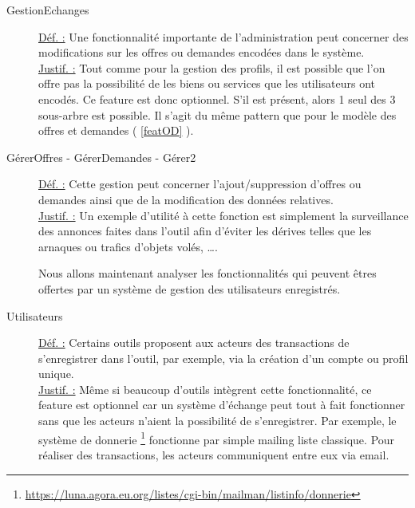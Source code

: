 \begin{description}
\item [GestionEchanges]
\underline{Déf. :}  Une fonctionnalité importante de l'administration peut concerner des modifications sur les offres ou demandes encodées dans le système.
\\ \underline{Justif. :}  Tout comme pour la gestion des profils,  il est possible que l'on offre pas la possibilité de les biens ou services que les utilisateurs ont encodés.  Ce feature est donc optionnel.  S'il est présent,  alors 1 seul des 3 sous-arbre est possible.  Il s'agit du même pattern que pour le modèle des offres et demandes ( \ref{featOD} ).
\newline

\item [GérerOffres - GérerDemandes - Gérer2]
\underline{Déf. :}  Cette gestion peut concerner l'ajout/suppression d'offres ou demandes ainsi que de la modification des données relatives.  
\\ \underline{Justif. :}  Un exemple d'utilité à cette fonction est simplement la surveillance des annonces faites dans l'outil afin d'éviter les dérives telles que les arnaques ou trafics d'objets volés,  \dots .   
\newline

Nous allons maintenant analyser les fonctionnalités qui peuvent êtres offertes par un système de gestion des utilisateurs enregistrés.

\begin{center}
\end{center}

\item [Utilisateurs]
\label{featUtils} 
\underline{Déf. :}  Certains outils proposent aux acteurs des transactions de s'enregistrer dans l'outil,  par exemple,  via la création d'un compte ou profil unique.  
\\ \underline{Justif. :}  Même si beaucoup d'outils intègrent cette fonctionnalité,  ce feature est optionnel car un système d'échange peut tout à fait fonctionner sans que les acteurs n'aient la possibilité de s'enregistrer.  Par exemple,  le système de donnerie \footnote{\href{https://luna.agora.eu.org/listes/cgi-bin/mailman/listinfo/donnerie}{https://luna.agora.eu.org/listes/cgi-bin/mailman/listinfo/donnerie}} fonctionne par simple mailing liste classique.  Pour réaliser des transactions,  les acteurs communiquent entre eux via email.
\newline


\end{description}

